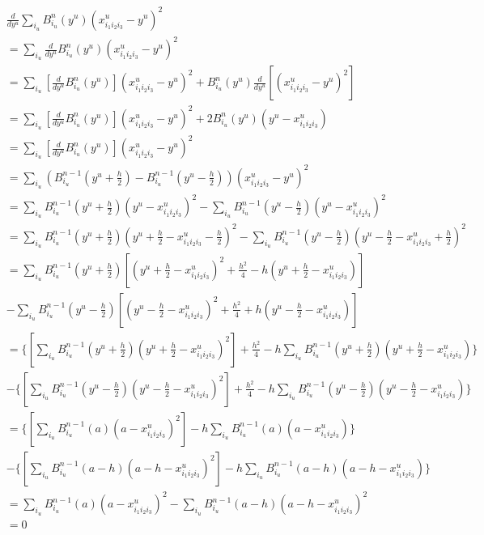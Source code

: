 \begin{equation}
    \begin{split}
        &\frac{d}{dy^u}\sum_{i_u} B_{i_u}^n(y^u) (x_{i_1 i_2 i_3}^u - y^u)^2\\ 
        &= \sum_{i_u} \frac{d}{dy^u} B_{i_u}^n(y^u) (x_{i_1 i_2 i_3}^u - y^u)^2\\
        &= \sum_{i_u} [\frac{d}{dy^u} B_{i_u}^n(y^u)] (x_{i_1 i_2 i_3}^u - y^u)^2 + B_{i_u}^n(y^u)\frac{d}{dy^u}[(x_{i_1 i_2 i_3}^u - y^u)^2]\\
        &= \sum_{i_u} [\frac{d}{dy^u} B_{i_u}^n(y^u)] (x_{i_1 i_2 i_3}^u - y^u)^2 + 2B_{i_u}^n(y^u)(y^u - x_{i_1i_2i_3}^u)\\
        &= \sum_{i_u} [\frac{d}{dy^u} B_{i_u}^n(y^u)] (x_{i_1 i_2 i_3}^u - y^u)^2\\
        &= \sum_{i_u} (B_{i_u}^{n-1}(y^u + \frac{h}{2}) - B_{i_u}^{n-1}(y^u - \frac{h}{2})) (x_{i_1 i_2 i_3}^u - y^u)^2\\
        &= \sum_{i_u} B_{i_u}^{n-1}(y^u + \frac{h}{2}) (y^u - x_{i_1 i_2 i_3}^u)^2 - \sum_{i_u}B_{i_u}^{n-1}(y^u - \frac{h}{2}) (y^u - x_{i_1 i_2 i_3}^u)^2\\   
        &= \sum_{i_u} B_{i_u}^{n-1}(y^u + \frac{h}{2}) (y^u + \frac{h}{2} - x_{i_1 i_2 i_3}^u - \frac{h}{2})^2 -  \sum_{i_u} B_{i_u}^{n-1}(y^u - \frac{h}{2}) (y^u - \frac{h}{2} - x_{i_1 i_2 i_3}^u + \frac{h}{2})^2\\   
        &= \sum_{i_u} B_{i_u}^{n-1}(y^u + \frac{h}{2}) [(y^u + \frac{h}{2} - x_{i_1 i_2 i_3}^u)^2 + \frac{h^2}{4} - h(y^u + \frac{h}{2} - x_{i_1 i_2 i_3}^u)] \\
        &- \sum_{i_u} B_{i_u}^{n-1}(y^u - \frac{h}{2}) [(y^u - \frac{h}{2} - x_{i_1 i_2 i_3}^u)^2 + \frac{h^2}{4} + h(y^u - \frac{h}{2} - x_{i_1 i_2 i_3}^u)]\\
        &= \{[\sum_{i_u} B_{i_u}^{n-1}(y^u + \frac{h}{2}) (y^u + \frac{h}{2} - x_{i_1 i_2 i_3}^u)^2] + \frac{h^2}{4} - h\sum_{i_u}B_{i_u}^{n-1}(y^u + \frac{h}{2})(y^u + \frac{h}{2} - x_{i_1 i_2 i_3}^u)\}\\
        &- \{[\sum_{i_u} B_{i_u}^{n-1}(y^u - \frac{h}{2}) (y^u - \frac{h}{2} - x_{i_1 i_2 i_3}^u)^2] + \frac{h^2}{4} - h\sum_{i_u}B_{i_u}^{n-1}(y^u - \frac{h}{2})(y^u - \frac{h}{2} - x_{i_1 i_2 i_3}^u)\}\\
        &= \{[\sum_{i_u} B_{i_u}^{n-1}(a) (a - x_{i_1 i_2 i_3}^u)^2]  - h\sum_{i_u}B_{i_u}^{n-1}(a)(a - x_{i_1 i_2 i_3}^u)\}\\
        &- \{[\sum_{i_u} B_{i_u}^{n-1}(a - h) (a - h - x_{i_1 i_2 i_3}^u)^2] - h\sum_{i_u}B_{i_u}^{n-1}(a - h)(a - h - x_{i_1 i_2 i_3}^u) \}\\
        &= \sum_{i_u} B_{i_u}^{n-1}(a) (a - x_{i_1 i_2 i_3}^u)^2 - \sum_{i_u} B_{i_u}^{n-1}(a - h) (a - h - x_{i_1 i_2 i_3}^u)^2\\
        &= 0 \\
    \end{split}
\end{equation}

